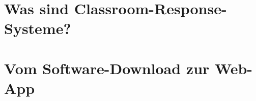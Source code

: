%
\section{Was sind Classroom-Response-Systeme?}
\label{chap:wassindcrs}

%
\section{Vom Software-Download zur Web-App}
\label{chap:webapp}

%
